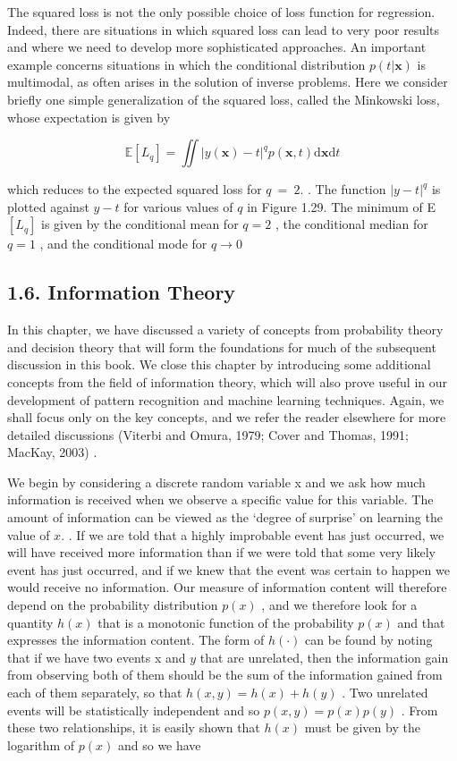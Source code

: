 \documentclass[
  10
]{article}
\begin{document}
The squared loss is not the only possible choice of loss function for
regression. Indeed, there are situations in which squared loss can lead
to very poor results and where we need to develop more sophisticated
approaches. An important example concerns situations in which the
conditional distribution \(p ( t | \mathbf { x } )\) is multimodal, as
often arises in the solution of inverse problems. Here we consider
briefly one simple generalization of the squared loss, called the
Minkowski loss, whose expectation is given by

\[
\mathbb {E} [ L _ {q} ] = \iint | y (\mathbf {x}) - t | ^ {q} p (\mathbf {x}, t) \mathrm{d} \mathbf {x} \mathrm{d} t\tag{1.91}
\]

which reduces to the expected squared loss for \(q \ = \ 2 .\) . The
function \(\lvert y - t \rvert ^ { q }\) is plotted against \(y - t\)
for various values of \(q\) in Figure 1.29. The minimum of E
\([ L _ { q } ]\) is given by the conditional mean for \(q = 2\) , the
conditional median for \(q = 1\) , and the conditional mode for
\(q \to 0\)

\subsection{1.6. Information Theory}\label{information-theory}

In this chapter, we have discussed a variety of concepts from
probability theory and decision theory that will form the foundations
for much of the subsequent discussion in this book. We close this
chapter by introducing some additional concepts from the field of
information theory, which will also prove useful in our development of
pattern recognition and machine learning techniques. Again, we shall
focus only on the key concepts, and we refer the reader elsewhere for
more detailed discussions (Viterbi and Omura, 1979; Cover and Thomas,
1991; MacKay, 2003) .

We begin by considering a discrete random variable x and we ask how much
information is received when we observe a specific value for this
variable. The amount of information can be viewed as the `degree of
surprise' on learning the value of \(x .\) . If we are told that a
highly improbable event has just occurred, we will have received more
information than if we were told that some very likely event has just
occurred, and if we knew that the event was certain to happen we would
receive no information. Our measure of information content will
therefore depend on the probability distribution \(p ( x )\) , and we
therefore look for a quantity \(h ( x )\) that is a monotonic function
of the probability \(p ( x )\) and that expresses the information
content. The form of \(h ( \cdot )\) can be found by noting that if we
have two events x and \(y\) that are unrelated, then the information
gain from observing both of them should be the sum of the information
gained from each of them separately, so that
\(h ( x , y ) = h ( x ) + h ( y )\) . Two unrelated events will be
statistically independent and so \(p ( x , y ) = p ( x ) p ( y )\) .
From these two relationships, it is easily shown that \(h ( x )\) must
be given by the logarithm of \(p ( x )\) and so we have
\end{document}
